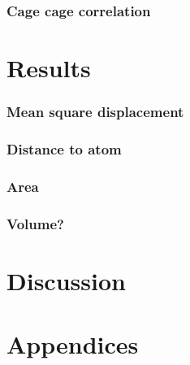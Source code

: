 \documentclass[twoside,english]{uiofysmaster}
\begin{document}
    \section{Cage cage correlation}
    \section{}

\part{Results}
    \section{Mean square displacement}
    \section{Distance to atom}
    \section{Area}
    \section{Volume?}

\part{Discussion}

\part{Appendices}


\end{document}
